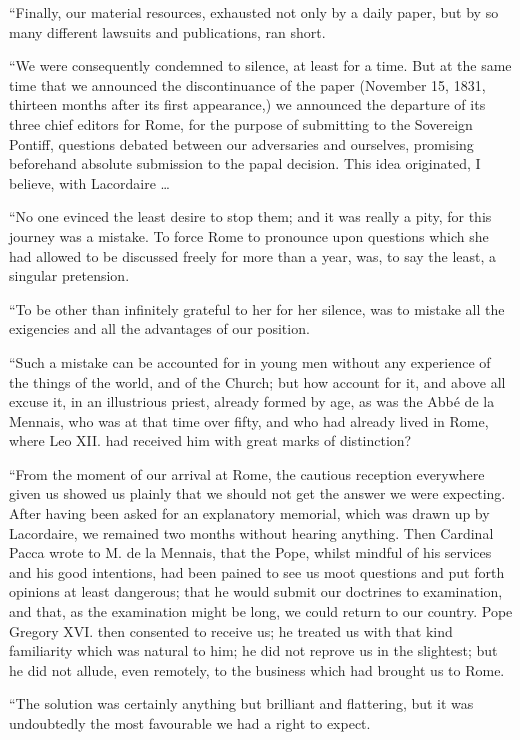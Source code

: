 ``Finally, our material resources, exhausted not
only by a daily paper, but by so many different lawsuits and
publications, ran short.

``We were consequently condemned to silence, at
least for a time. But at the same time that we announced the
discontinuance of the paper (November 15, 1831, thirteen months after
its first appearance,) we announced the departure of its three chief
editors for Rome, for the purpose of submitting to the Sovereign
Pontiff, questions debated between our adversaries and ourselves,
promising beforehand absolute submission to the papal decision. This
idea originated, I believe, with Lacordaire …

``No one evinced the least desire to stop them;
and it was really a pity, for this journey was a mistake. To force Rome to pronounce upon questions which she had allowed to be
discussed freely for more than a year, was, to say the least, a
singular pretension.

``To be other than infinitely grateful to her for
her silence, was to mistake all the exigencies and all the advantages
of our position.

``Such a mistake can be accounted for in young men
without any experience of the things of the world, and of the Church;
but how account for it, and above all excuse it, in an illustrious
priest, already formed by age, as was the Abbé de la Mennais, who was
at that time over fifty, and who had already lived in Rome, where Leo
XII. had received him with great marks of distinction?

``From the moment of our arrival at Rome, the
cautious reception everywhere given us showed us plainly that we
should not get the answer we were expecting. After having been asked
for an explanatory memorial, which was drawn up by Lacordaire, we
remained two months without hearing anything. Then Cardinal Pacca
wrote to M. de la Mennais, that the Pope, whilst mindful of his
services and his good intentions, had been pained to see us moot
questions and put forth opinions at least dangerous; that he would
submit our doctrines to examination, and that, as the examination
might be long, we could return to our country. Pope Gregory XVI. then
consented to receive us; he treated us with that kind familiarity
which was natural to him; he did not reprove us in the slightest; but
he did not allude, even remotely, to the business which had brought us
to Rome.

``The solution was certainly anything but
brilliant and flattering, but it was undoubtedly the most favourable
we had a right to expect.

